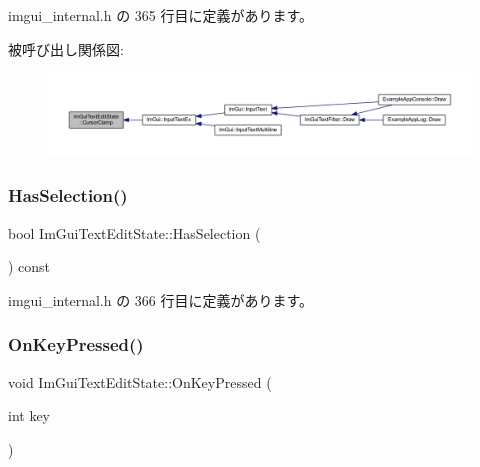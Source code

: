  imgui\+\_\+internal.\+h の 365 行目に定義があります。

被呼び出し関係図\+:\nopagebreak
\begin{figure}[H]
\begin{center}
\leavevmode
\includegraphics[width=350pt]{struct_im_gui_text_edit_state_ac6f8184c63c826dfc9bc2a47ba57b80c_icgraph}
\end{center}
\end{figure}
\mbox{\label{struct_im_gui_text_edit_state_a46735493114451380c2d3684b528d124}} 
\subsubsection{\texorpdfstring{Has\+Selection()}{HasSelection()}}
{\footnotesize\ttfamily bool Im\+Gui\+Text\+Edit\+State\+::\+Has\+Selection (\begin{DoxyParamCaption}{ }\end{DoxyParamCaption}) const\hspace{0.3cm}{\ttfamily [inline]}}



 imgui\+\_\+internal.\+h の 366 行目に定義があります。

\mbox{\label{struct_im_gui_text_edit_state_a30a1d78690ef2bbb9d4b8f75385b8c26}} 
\subsubsection{\texorpdfstring{On\+Key\+Pressed()}{OnKeyPressed()}}
{\footnotesize\ttfamily void Im\+Gui\+Text\+Edit\+State\+::\+On\+Key\+Pressed (\begin{DoxyParamCaption}\item[{int}]{key }\end{DoxyParamCaption})}




